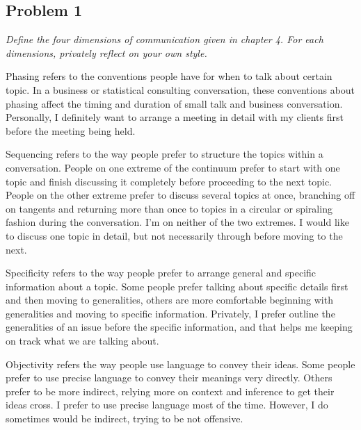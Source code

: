 \documentclass[a4paper,11pt]{article}
\begin{document}
\subsection*{Problem 1}
\emph{\indent Define the four dimensions of communication given in chapter 4. For each dimensions, privately reflect on your own style.}
\begin{paragraph}
  {Phasing} refers to the conventions people have for when to talk about certain topic. In a business or statistical consulting conversation, these conventions about phasing affect the timing and duration of small talk and business conversation. Personally, I definitely want to arrange a meeting in detail with my clients first before the meeting being held.
\end{paragraph}

\begin{paragraph}
  {Sequencing} refers to the way people prefer to structure the topics within a conversation. People on one extreme of the continuum prefer to start with one topic and finish discussing it completely before proceeding to the next topic. People on the other extreme prefer to discuss several topics at once, branching off on tangents and returning more than once to topics in a circular or spiraling fashion during the conversation. I'm on neither of the two extremes. I would like to discuss one topic in detail, but not necessarily through before moving to the next.
\end{paragraph}

\begin{paragraph}
  {Specificity} refers to the way people prefer to arrange general and specific information about a topic. Some people prefer talking about specific details first and then moving to generalities, others are more comfortable beginning with generalities and moving to specific information. Privately, I prefer outline the generalities of an issue before the specific information, and that helps me keeping on track what we are talking about.
\end{paragraph}

\begin{paragraph}
  {Objectivity} refers the way people use language to convey their ideas. Some people prefer to use precise language to convey their meanings very directly. Others prefer to be more indirect, relying more on context and inference to get their ideas cross. I prefer to use precise language most of the time. However, I do sometimes would be indirect, trying to be not offensive.
\end{paragraph}
\end{document}
